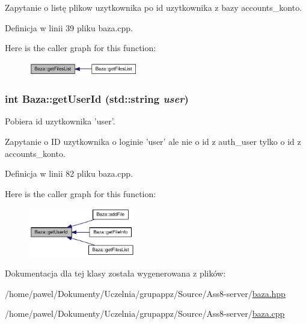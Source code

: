 Zapytanie o listę plikow uzytkownika po id uzytkownika z bazy accounts\_\-konto. 

Definicja w linii 39 pliku baza.cpp.

Here is the caller graph for this function:\nopagebreak
\begin{figure}[H]
\begin{center}
\leavevmode
\includegraphics[width=136pt]{a00001_02db3388d088212bd443ee39998b5cf8_icgraph}
\end{center}
\end{figure}
\hypertarget{a00001_65054f08c8fd7c600f6c2fe2c7f61a43}{
\subsubsection[{getUserId}]{\setlength{\rightskip}{0pt plus 5cm}int Baza::getUserId (std::string {\em user})}}
\label{a00001_65054f08c8fd7c600f6c2fe2c7f61a43}


Pobiera id uzytkownika 'user'. 

Zapytanie o ID uzytkownika o loginie 'user' ale nie o id z auth\_\-user tylko o id z accounts\_\-konto. 

Definicja w linii 82 pliku baza.cpp.

Here is the caller graph for this function:\nopagebreak
\begin{figure}[H]
\begin{center}
\leavevmode
\includegraphics[width=132pt]{a00001_65054f08c8fd7c600f6c2fe2c7f61a43_icgraph}
\end{center}
\end{figure}


Dokumentacja dla tej klasy została wygenerowana z plików:\begin{CompactItemize}
\item 
/home/pawel/Dokumenty/Uczelnia/grupappz/Source/Ass8-server/\hyperlink{a00004}{baza.hpp}\item 
/home/pawel/Dokumenty/Uczelnia/grupappz/Source/Ass8-server/\hyperlink{a00003}{baza.cpp}\end{CompactItemize}
